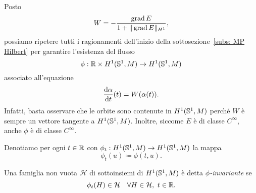 Posto
\[
	W = - \frac{\operatorname{grad} E}{1 + \|\operatorname{grad} E\|_{H^1}},
\]
possiamo ripetere tutti i ragionamenti dell'inizio della sottosezione~\ref{subs: MP Hilbert} per garantire l'esistenza del flusso 
\[
	\phi:\mathbb{R} \times H^1(\mathbb{S}^1,M) \to H^1(\mathbb{S}^1,M)
\]
associato all'equazione
\[
	\frac{\mathrm{d} \alpha}{\mathrm{d} t}(t) = W(\alpha(t)).
\]
Infatti, basta osservare che le orbite sono contenute in \(H^1(\mathbb{S}^1,M)\) perché \(W\) è sempre un vettore tangente a \(H^1(\mathbb{S}^1,M)\). Inoltre, siccome \(E\) è di classe \(C^\infty\), anche \(\phi\) è di classe \(C^\infty\).

Denotiamo per ogni \(t \in \mathbb{R}\) con \(\phi_t:H^1(\mathbb{S}^1,M) \to H^1(\mathbb{S}^1,M)\) la mappa 
\[
\phi_t(u) \coloneq \phi(t,u).
\]

\begin{defi}
	Una famiglia non vuota \(\mathcal{H}\) di sottoinsiemi di \(H^1(\mathbb{S}^1,M)\) è detta \textit{\(\phi\)-invariante} se 
	\[
		\phi_t(H) \in \mathcal{H} \quad \forall H \in \mathcal{H}, \ t \in \mathbb{R}.
	\]
\end{defi}

